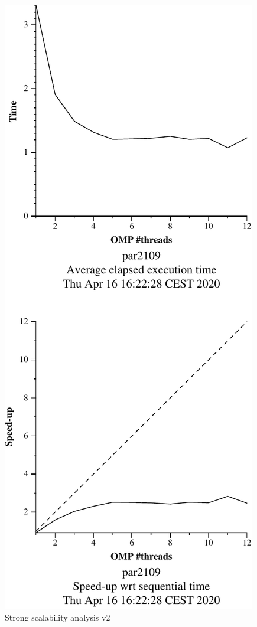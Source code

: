 \begin{figure}[H]
\begin{minipage}{0.5\textwidth}
        \includegraphics[width=0.7\linewidth]{plots/v2-crop.pdf}
        \caption{Strong scalability analysis v2}
        \label{fig:ssa_v2} 
    \end{minipage}
\end{figure}

